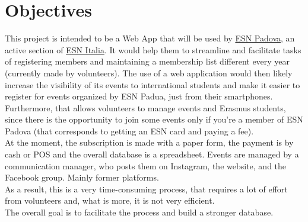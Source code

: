 \section{Objectives}

This project is intended to be a Web App that will be used by
\href{https://padova.esn.it/}{ESN Padova}, an active section of \href{https://padova.esn.it/}{ESN Italia}.
It would help them to streamline and facilitate tasks of
registering members and maintaining a membership list different every year (currently made by volunteers).
The use of a web application would then likely increase the visibility of its events to international students
and make it easier to register for events organized by ESN Padua, just from their smartphones.\\
Furthermore, that allows volunteers to
manage events and Erasmus students, since there is the opportunity to join some events
only if you’re a member of ESN Padova (that corresponds to getting an ESN card and paying a fee).\\
At the moment, the subscription is made with a paper form, the payment is by cash or POS and the overall database is a spreadsheet.
Events are managed by a communication manager, who posts them on Instagram, the website, and the Facebook group. Mainly former platforms.\\
As a result, this is a very time-consuming process, that requires a lot of effort from volunteers
and, what is more, it is not very efficient.\\
The overall goal is to facilitate the process and build a stronger database.